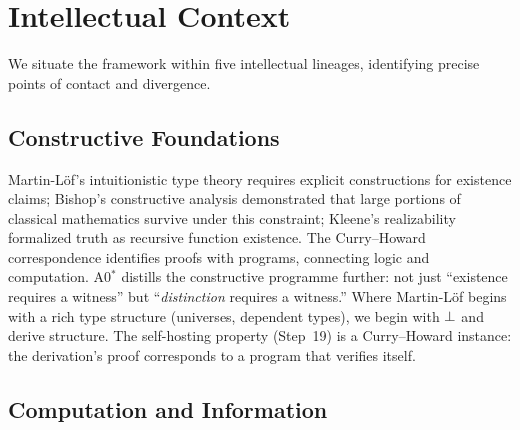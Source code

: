 
\section{Intellectual Context}
\label{sec:related}

We situate the \Opoch{} framework within five intellectual lineages,
identifying precise points of contact and divergence.

\subsection{Constructive Foundations}
\label{sec:related:constructive}

Martin-L\"{o}f's intuitionistic type theory \citep{martinlof1984} requires
explicit constructions for existence claims; Bishop's constructive
analysis \citep{bishop1967} demonstrated that large portions of classical
mathematics survive under this constraint; Kleene's
realizability \citep{kleene1952} formalized truth as recursive function
existence.  The Curry--Howard correspondence identifies proofs with
programs, connecting logic and computation.  A0$^*$ distills the constructive
programme further: not just ``existence requires a witness'' but
``\emph{distinction} requires a witness.''  Where Martin-L\"{o}f begins
with a rich type structure (universes, dependent types), we begin with
$\bot$ and derive structure.  The self-hosting property (Step~19) is a
Curry--Howard instance: the derivation's proof corresponds to a program
that verifies itself.

\subsection{Computation and Information}
\label{sec:related:computation}

